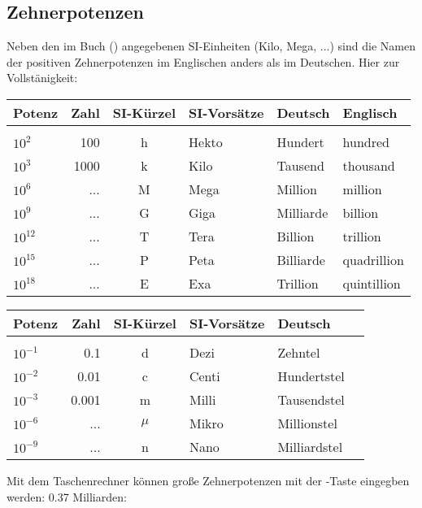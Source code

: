 \subsection{Zehnerpotenzen}


Neben den im Buch () angegebenen SI-Einheiten (Kilo, Mega, ...) sind die
Namen der positiven Zehnerpotenzen im Englischen anders als im
Deutschen. Hier zur Vollstänigkeit:

\begin{tabular}{lrclll}
Potenz    & Zahl & SI-Kürzel & SI-Vorsätze & Deutsch & Englisch\\
\hline\\
$10^{2}$   & 100  & h         & Hekto       & Hundert   & hundred\\
$10^{3}$   & 1000 & k         & Kilo        & Tausend   & thousand\\
$10^{6}$   & ...  & M         & Mega        & Million   & million\\
$10^{9}$   & ...  & G         & Giga        & Milliarde & billion\\
$10^{12}$  & ...  & T         & Tera        & Billion   & trillion\\
$10^{15}$  & ...  & P         & Peta        & Billiarde & quadrillion\\
$10^{18}$  & ...  & E         & Exa         & Trillion  & quintillion\\
\end{tabular}

\begin{tabular}{lrclll}
Potenz     & Zahl & SI-Kürzel & SI-Vorsätze & Deutsch\\
\hline\\
$10^{-1}$  & 0.1   & d         & Dezi        & Zehntel\\
$10^{-2}$  & 0.01  & c         & Centi       & Hundertstel\\
$10^{-3}$  & 0.001 & m         & Milli       & Tausendstel\\
$10^{-6}$  & ...   & $\mu$     & Mikro       & Millionstel\\
$10^{-9}$  & ...   & n         & Nano        & Milliardstel\\
\end{tabular}

Mit dem Taschenrechner können große Zehnerpotenzen mit der
  -Taste eingegben
  werden: 0.37 Milliarden:

